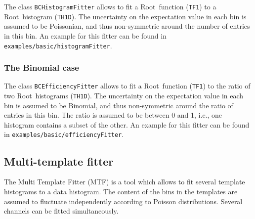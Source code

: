 \documentclass[11pt, a4paper]{article}
\newcommand{\Root}{{\sc Root}}
\begin{document}
The class \verb|BCHistogramFitter| allows to fit a \Root\ function
(\verb|TF1|) to a \Root\ histogram (\verb|TH1D|). The uncertainty on
the expectation value in each bin is assumed to be Poissonian, and
thus non-symmetric around the number of entries in this bin.  An
example for this fitter can be found in
\verb|examples/basic/histogramFitter|.


\subsubsection{The Binomial case}

The class \verb|BCEfficiencyFitter| allows to fit a \Root\ function
(\verb|TF1|) to the ratio of two \Root\ histograms (\verb|TH1D|). The
uncertainty on the expectation value in each bin is assumed to be
Binomial, and thus non-symmetric around the ratio of entries in this
bin. The ratio is assumed to be between 0 and 1, i.e., one histogram
contains a subset of the other.  An example for this fitter can be
found in \verb|examples/basic/efficiencyFitter|.


\clearpage
\pagebreak

\subsection{Multi-template fitter}
\label{section:MTF}


The Multi Template Fitter (MTF) is a tool which allows to fit several
template histograms to a data histogram. The content of the bins in
the templates are assumed to fluctuate independently according to
Poisson distributions. Several channels can be fitted simultaneously.

\end{document}
